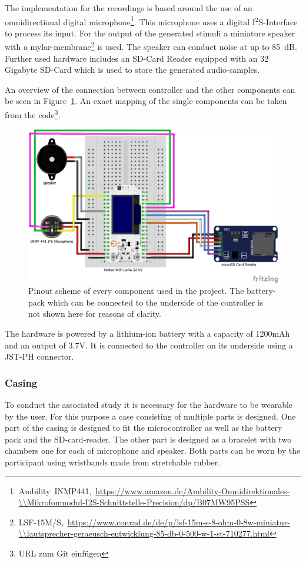 The implementation for the recordings is based around the use of an omnidirectional digital microphone\footnote{Ambility~INMP441,~\url{https://www.amazon.de/Ambility-Omnidirektionales-\\Mikrofonmodul-I2S-Schnittstelle-Precision/dp/B07MW95PSS}}.
This microphone uses a digital I$^{2}$S-Interface to process its input. 
For the output of the generated stimuli a miniature speaker with a mylar-membrane\footnote{LSF-15M/S,~\url{https://www.conrad.de/de/p/lsf-15m-s-8-ohm-0-8w-miniatur-\\lautsprecher-geraeusch-entwicklung-85-db-0-500-w-1-st-710277.html}} is used.
The speaker can conduct noise at up to 85~dB.
Further used hardware includes an SD-Card Reader equipped with an 32 Gigabyte SD-Card which is used to store the generated audio-samples.

An overview of the connection between controller and the other components can be seen in Figure~\ref{fig:pinout}.
An exact mapping of the single components can be taken from the code\footnote{URL zum Git einfügen}.
\begin{figure}[H]
	\includegraphics[width=\linewidth]{Media/Hardware_Pinout.png}
	\caption{Pinout scheme of every component used in the project. The battery-pack which can be connected to the underside of the controller is not shown here for reasons of clarity.}
	\label{fig:pinout}
\end{figure}
The hardware is powered by a lithium-ion battery with a capacity of 1200mAh and an output of 3.7V.
It is connected to the controller on its underside using a JST-PH connector. 

\subsubsection{Casing}
To conduct the associated study it is necessary for the hardware to be wearable by the user. 
For this purpose a case consisting of multiple parts is designed.
One part of the casing is designed to fit the microcontroller as well as the battery pack and the SD-card-reader.
The other part is designed as a bracelet with two chambers one for each of microphone and speaker.  
Both parts can be worn by the participant using wristbands made from stretchable rubber.


